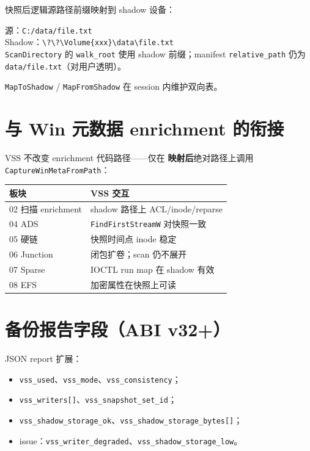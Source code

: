快照后逻辑源路径前缀映射到 shadow 设备：

\begin{phasebox}[路径映射示例]
源：\texttt{C:/data/file.txt}\\
Shadow：\texttt{\textbackslash?\textbackslash?\textbackslash Volume\{xxx\}\textbackslash data\textbackslash file.txt}\\
\texttt{ScanDirectory} 的 \texttt{walk\_root} 使用 shadow 前缀；manifest \texttt{relative\_path} 仍为 \texttt{data/file.txt}（对用户透明）。
\end{phasebox}

\texttt{MapToShadow} / \texttt{MapFromShadow} 在 session 内维护双向表。

\section{与 Win 元数据 enrichment 的衔接}

VSS 不改变 enrichment 代码路径——仅在 \textbf{映射后}绝对路径上调用 \texttt{CaptureWinMetaFromPath}：

\begin{center}
\begin{tabular}{@{}ll@{}}
\toprule
板块 & VSS 交互 \\
\midrule
02 扫描 enrichment & shadow 路径上 ACL/inode/reparse \\
04 ADS & \texttt{FindFirstStreamW} 对快照一致 \\
05 硬链 & 快照时间点 inode 稳定 \\
06 Junction & 闭包扩卷；scan 仍不展开 \\
07 Sparse & IOCTL run map 在 shadow 有效 \\
08 EFS & 加密属性在快照上可读 \\
\bottomrule
\end{tabular}
\end{center}

\section{备份报告字段（ABI v32+）}

JSON report 扩展：
\begin{itemize}[nosep]
  \item \texttt{vss\_used}、\texttt{vss\_mode}、\texttt{vss\_consistency}；
  \item \texttt{vss\_writers[]}、\texttt{vss\_snapshot\_set\_id}；
  \item \texttt{vss\_shadow\_storage\_ok}、\texttt{vss\_shadow\_storage\_bytes[]}；
  \item issue：\texttt{vss\_writer\_degraded}、\texttt{vss\_shadow\_storage\_low}。
\end{itemize}

